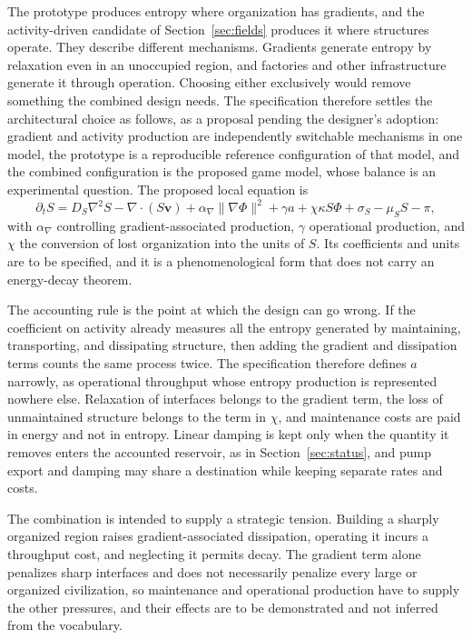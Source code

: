 \documentclass[11pt]{article}
\begin{document}
The prototype produces entropy where organization has gradients, and the activity-driven candidate of Section~\ref{sec:fields} produces it where structures operate. They describe different mechanisms. Gradients generate entropy by relaxation even in an unoccupied region, and factories and other infrastructure generate it through operation. Choosing either exclusively would remove something the combined design needs. The specification therefore settles the architectural choice as follows, as a proposal pending the designer's adoption: gradient and activity production are independently switchable mechanisms in one model, the prototype is a reproducible reference configuration of that model, and the combined configuration is the proposed game model, whose balance is an experimental question. The proposed local equation is
\[
\partial_t S = D_S\nabla^2 S - \nabla\!\cdot(S\mathbf{v}) + \alpha_\nabla\lVert\nabla\Phi\rVert^2 + \gamma a + \chi\kappa S\Phi + \sigma_S - \mu_S S - \pi,
\]
with $\alpha_\nabla$ controlling gradient-associated production, $\gamma$ operational production, and $\chi$ the conversion of lost organization into the units of $S$. Its coefficients and units are to be specified, and it is a phenomenological form that does not carry an energy-decay theorem.

The accounting rule is the point at which the design can go wrong. If the coefficient on activity already measures all the entropy generated by maintaining, transporting, and dissipating structure, then adding the gradient and dissipation terms counts the same process twice. The specification therefore defines $a$ narrowly, as operational throughput whose entropy production is represented nowhere else. Relaxation of interfaces belongs to the gradient term, the loss of unmaintained structure belongs to the term in $\chi$, and maintenance costs are paid in energy and not in entropy. Linear damping is kept only when the quantity it removes enters the accounted reservoir, as in Section~\ref{sec:status}, and pump export and damping may share a destination while keeping separate rates and costs.

The combination is intended to supply a strategic tension. Building a sharply organized region raises gradient-associated dissipation, operating it incurs a throughput cost, and neglecting it permits decay. The gradient term alone penalizes sharp interfaces and does not necessarily penalize every large or organized civilization, so maintenance and operational production have to supply the other pressures, and their effects are to be demonstrated and not inferred from the vocabulary.
\end{document}
